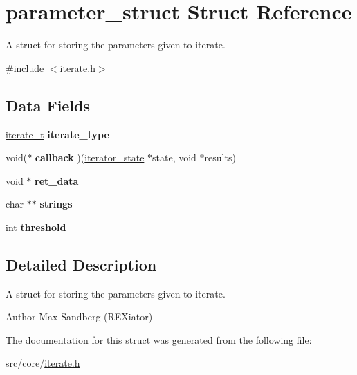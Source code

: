 \hypertarget{structparameter__struct}{\section{parameter\-\_\-struct \-Struct \-Reference}
\label{structparameter__struct}
}


\-A struct for storing the parameters given to iterate.  




{\ttfamily \#include $<$iterate.\-h$>$}

\subsection*{\-Data \-Fields}
\begin{DoxyCompactItemize}
\item 
\hypertarget{structparameter__struct_a4619038bc117bf7793cf3e73c4734844}{\hyperlink{iterate_8h_a99b1f8da2b2ff87bdf337fbf9353840f}{iterate\-\_\-t} {\bfseries iterate\-\_\-type}}\label{structparameter__struct_a4619038bc117bf7793cf3e73c4734844}

\item 
\hypertarget{structparameter__struct_a28507d34727a37b5e53a3913fe70acc4}{void($\ast$ {\bfseries callback} )(\hyperlink{iterate_8h_structiterator__state}{iterator\-\_\-state} $\ast$state, void $\ast$results)}\label{structparameter__struct_a28507d34727a37b5e53a3913fe70acc4}

\item 
\hypertarget{structparameter__struct_acecff2cc3ad84d550594f869bdd12cd6}{void $\ast$ {\bfseries ret\-\_\-data}}\label{structparameter__struct_acecff2cc3ad84d550594f869bdd12cd6}

\item 
\hypertarget{structparameter__struct_aae14e6e92164121fc413f3fda2c228de}{char $\ast$$\ast$ {\bfseries strings}}\label{structparameter__struct_aae14e6e92164121fc413f3fda2c228de}

\item 
\hypertarget{structparameter__struct_a1820963f84d6a3d0652a65e3ce9f1840}{int {\bfseries threshold}}\label{structparameter__struct_a1820963f84d6a3d0652a65e3ce9f1840}

\end{DoxyCompactItemize}


\subsection{\-Detailed \-Description}
\-A struct for storing the parameters given to iterate. 

\begin{DoxyAuthor}{\-Author}
\-Max \-Sandberg (\-R\-E\-Xiator) 
\end{DoxyAuthor}


\-The documentation for this struct was generated from the following file\-:\begin{DoxyCompactItemize}
\item 
src/core/\hyperlink{iterate_8h}{iterate.\-h}\end{DoxyCompactItemize}
